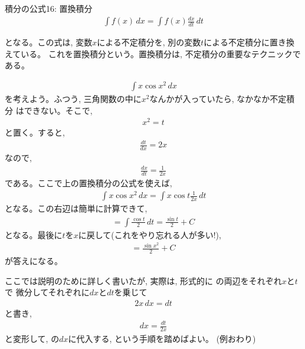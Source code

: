 \begin{itembox}{積分の公式16: 置換積分}
\begin{eqnarray}
\int f(x) \,dx = \int f(x)\frac{dx}{dt} \,dt
\label{eq:integ_substitute}\end{eqnarray}
\end{itembox}
となる。この式は, 変数$x$による不定積分を, 別の変数$t$による不定積分に置き換えている。
これを置換積分という。置換積分は, 不定積分の重要なテクニックである。

\begin{exmpl}
\begin{eqnarray}
\int x \cos x^2 \,dx\label{eq:ex_chikan_xcosxx_0}
\end{eqnarray}
を考えよう。ふつう, 三角関数の中に$x^2$なんかが入っていたら, なかなか不定積分
はできない。そこで, 
\begin{eqnarray}
x^2=t\label{eq:ex_chikan_xcosxx_01}
\end{eqnarray}
と置く。すると, 
\begin{eqnarray}\frac{dt}{dx}=2x\label{eq:ex_chikan_xcosxx_1}\end{eqnarray}
なので, 
\begin{eqnarray}
\frac{dx}{dt}=\frac{1}{2x}\label{eq:ex_chikan_xcosxx_2}
\end{eqnarray}
である。ここで上の置換積分の公式を使えば, 
\begin{eqnarray}
\int x \cos x^2 \,dx = \int x \cos t \frac{1}{2x}\,dt
\end{eqnarray}
となる。この右辺は簡単に計算できて, 
\begin{eqnarray} = \int \frac{\cos t}{2}\,dt = \frac{\sin t}{2}+C\end{eqnarray}
となる。最後に$t$を$x$に戻して(これをやり忘れる人が多い!), 
\begin{eqnarray}
 = \frac{\sin x^2}{2}+C
\end{eqnarray}
が答えになる。

ここでは説明のために詳しく書いたが, 実際は, 形式的に
の両辺をそれぞれ$x$と$t$で
微分してそれぞれに$dx$と$dt$を乗じて
\begin{eqnarray}2x\,dx=dt\end{eqnarray}
と書き, 
\begin{eqnarray}
dx=\frac{dt}{2x}
\end{eqnarray}
と変形して, の$dx$に代入する, という手順を踏めばよい。
(例おわり)\end{exmpl}
\vspace{0.3cm}

